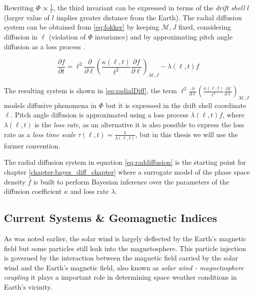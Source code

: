 Rewriting $\Phi \propto \frac{1}{\ell}$, the third invariant can be expressed in terms of the 
\emph{drift shell} $l$ (larger value of $l$ implies greater distance from the Earth). The radial diffusion system 
can be obtained from \ref{eq:fokker} by keeping $\mathcal{M}, J$ fixed, considering diffusion in $\ell$ 
(violation of $\Phi$ invariance) and by approximating pitch angle diffusion as a loss process 
\citep{roederer2012dynamics,Walt1970}.  

\begin{equation}\label{eq:radialDiff}
    \frac{\partial{f}}{\partial{t}} = \ell^2 \frac{\partial}{\partial{\ell}} \left( \frac{\kappa(\ell,
        t)}{\ell^{2}} \frac{\partial{f}}{\partial{\ell}}
    \right)_{\mathcal{M}, J} - \lambda(\ell,t) f
\end{equation}

The resulting system is shown in \ref{eq:radialDiff}, the term 
$\ell^2 \frac{\partial}{\partial{\ell}} \left( \frac{\kappa(\ell,t)}{\ell^{2}} \frac{\partial{f}}{\partial{\ell}}
\right)_{\mathcal{M}, J}$ models diffusive phenomena in $\Phi$ but it is expressed in the drift shell coordinate $\ell$. 
Pitch angle diffusion is approximated using a loss process $\lambda(\ell,t) f$, where $\lambda(\ell,t)$ is the 
\emph{loss rate}, as an alternative it is also possible to express the loss rate as a \emph{loss time scale} 
$\tau(\ell,t) = \frac{1}{\lambda(\ell,t)}$, but in this thesis we will use the former convention.

The radial diffusion system in equation \ref{eq:raddiffusion} is the starting point for chapter 
\ref{chapter:bayes_diff_chapter} where a surrogate model of the phase space density $\hat{f}$ is built to 
perform Bayesian inference over the parameters of the diffusion coefficient $\kappa$ and loss rate 
$\lambda$.

\subsection{Current Systems \& Geomagnetic Indices}\label{sec:geoindex}

As was noted earlier, the solar wind is largely deflected by the Earth's magnetic field but some particles still 
leak into the magnetosphere. This particle injection is governed by the interaction between the magnetic field carried 
by the solar wind and the Earth's magnetic field, also known as \emph{solar wind - magnetosphere coupling} it 
plays a important role in determining space weather conditions in Earth's vicinity. 

